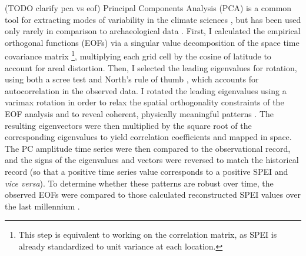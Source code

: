 \documentclass[10pt]{iopart}
\begin{document}
(TODO clarify pca vs eof)
Principal Components Analysis (PCA) is a common tool for extracting modes of variability in the climate sciences \parencite{lorenz,Hannachi2007}, but has been used only rarely in comparison to archaeological data \parencite{Weiss1982, Cordell2007}. First, I calculated the empirical orthogonal functions (EOFs) via a singular value decomposition of the space time covariance matrix \footnote{This step is equivalent to working on the correlation matrix, as SPEI is already standardized to unit variance at each location.}, multiplying each grid cell by the cosine of latitude to account for areal distortion. Then, I selected the leading eigenvalues for rotation, using both a scree test and North's rule of thumb \parencite{North1982}, which accounts for autocorrelation in the observed data. I rotated the leading eigenvalues using a varimax rotation in order to relax the spatial orthogonality constraints of the EOF analysis and to reveal coherent, physically meaningful patterns \parencite{Richman1986}. The resulting eigenvectors were then multiplied by the square root of the corresponding eigenvalues to yield correlation coefficients and mapped in space. The PC amplitude time series were then compared to the observational record, and the signs of the eigenvalues and vectors were reversed to match the historical record (so that a positive time series value corresponds to a positive SPEI and \textit{vice versa}). To determine whether these patterns are robust over time, the observed EOFs were compared to those calculated reconstructed SPEI values over the last millennium \parencite{Steiger2018}.
\end{document}
